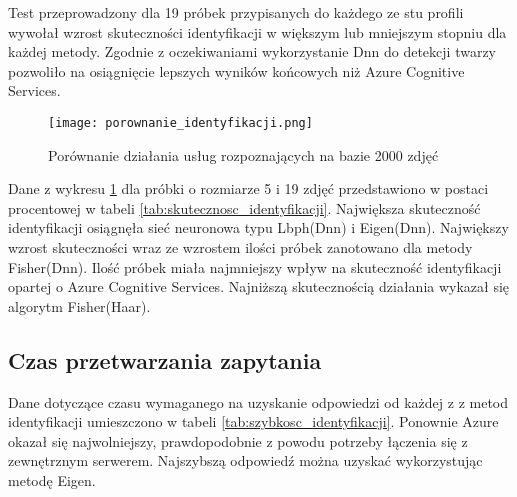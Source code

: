 Test przeprowadzony dla 19 próbek przypisanych do każdego ze stu profili wywołał  wzrost skuteczności identyfikacji w większym lub mniejszym stopniu dla każdej metody. Zgodnie z oczekiwaniami wykorzystanie Dnn do detekcji twarzy pozwoliło na osiągnięcie lepszych wyników końcowych niż Azure Cognitive Services.
\begin{figure}[H]
	\centering
	\texttt{[image: porownanie\_identyfikacji.png]}
	\caption{Porównanie działania usług rozpoznających na bazie 2000 zdjęć}
	\label{fig:porownanie_identyfikator}
\end{figure}
Dane z wykresu \ref{fig:porownanie_identyfikator} dla próbki o rozmiarze 5 i 19 zdjęć przedstawiono w postaci procentowej w tabeli \ref{tab:skutecznosc_identyfikacji}.
Największa skuteczność identyfikacji osiągnęła sieć neuronowa typu Lbph(Dnn) i Eigen(Dnn). Największy wzrost skuteczności wraz ze wzrostem ilości próbek zanotowano dla metody Fisher(Dnn). Ilość próbek miała najmniejszy wpływ na skuteczność identyfikacji opartej o Azure Cognitive Services. Najniższą skutecznością działania wykazał się algorytm Fisher(Haar).

\begin{table}[H]\label{tab:skutecznosc_identyfikacji}
	\centering
	\caption{Skuteczność identyfikacji wybranych metod}
\end{table}

\subsection{Czas przetwarzania zapytania}
Dane dotyczące czasu wymaganego na uzyskanie odpowiedzi od każdej z z metod identyfikacji umieszczono w tabeli \ref{tab:szybkosc_identyfikacji}. Ponownie Azure okazał się najwolniejszy, prawdopodobnie z powodu potrzeby łączenia się z zewnętrznym serwerem. Najszybszą odpowiedź można uzyskać wykorzystując metodę Eigen.


